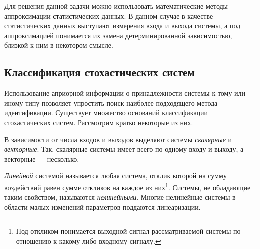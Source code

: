 Для решения данной задачи можно использовать математические методы аппроксимации статистических данных.
В данном случае в качестве статистических данных выступают измерения входа и выхода системы,
а под аппроксимацией понимается их замена детерминированной зависимостью,
близкой к ним в некотором смысле. %

\subsection{Классификация стохастических систем}

Использование априорной информации о принадлежности системы к тому или иному типу
позволяет упростить поиск наиболее подходящего метода идентификации.
Существует множество оснований классификации стохастических систем.
Рассмотрим кратко некоторые из них.

В зависимости от числа входов и выходов выделяют системы \emph{скалярные} и \emph{векторные}.
Так, скалярные системы имеет всего по одному входу и выходу,
а векторные --- несколько.

\textit{Линейной} системой называется любая система, отклик которой на сумму воздействий равен
сумме откликов на каждое из них\footnote{%
  Под откликом понимается выходной сигнал рассматриваемой системы по отношению к
  какому-либо входному сигналу.}.
Системы, не обладающие таким свойством, называются \emph{нелинейными}.
Многие нелинейные системы в области малых изменений параметров поддаются линеаризации.




